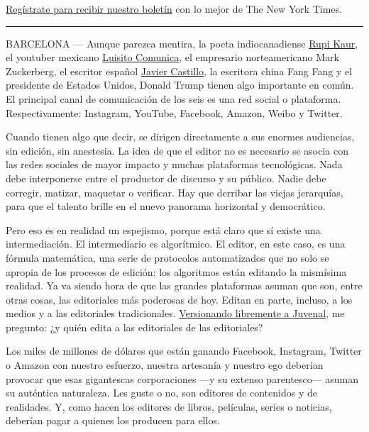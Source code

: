 \href{https://www.nytimes.com/newsletters/el-times}{Regístrate para
recibir nuestro boletín} con lo mejor de The New York Times.

\begin{center}\rule{0.5\linewidth}{\linethickness}\end{center}

BARCELONA --- Aunque parezca mentira, la poeta indiocanadiense
\href{https://www.instagram.com/rupikaur_/?hl=es}{Rupi Kaur}, el
youtuber mexicano
\href{https://www.youtube.com/user/LuisitoComunicaa}{Luisito Comunica},
el empresario norteamericano Mark Zuckerberg, el escritor español
\href{https://elpais.com/elpais/2020/03/04/icon/1583314253_152494.html}{Javier
Castillo}, la escritora china Fang Fang y el presidente de Estados
Unidos, Donald Trump tienen algo importante en común. El principal canal
de comunicación de los seis es una red social o plataforma.
Respectivamente: Instagram, YouTube, Facebook, Amazon, Weibo y Twitter.

Cuando tienen algo que decir, se dirigen directamente a sus enormes
audiencias, sin edición, sin anestesia. La idea de que el editor no es
necesario se asocia con las redes sociales de mayor impacto y muchas
plataformas tecnológicas. Nada debe interponerse entre el productor de
discurso y su público. Nadie debe corregir, matizar, maquetar o
verificar. Hay que derribar las viejas jerarquías, para que el talento
brille en el nuevo panorama horizontal y democrático.

Pero eso es en realidad un espejismo, porque está claro que sí existe
una intermediación. El intermediario es algorítmico. El editor, en este
caso, es una fórmula matemática, una serie de protocolos automatizados
que no solo se apropia de los procesos de edición: los algoritmos están
editando la mismísima realidad. Ya va siendo hora de que las grandes
plataformas asuman que son, entre otras cosas, las editoriales más
poderosas de hoy. Editan en parte, incluso, a los medios y a las
editoriales tradicionales.
\href{https://www.merriam-webster.com/dictionary/quis\%20custodiet\%20ipsos\%20custodes\%3F}{Versionando
libremente a Juvenal}, me pregunto: ¿y quién edita a las editoriales de
las editoriales?

Los miles de millones de dólares que están ganando Facebook, Instagram,
Twitter o Amazon con nuestro esfuerzo, nuestra artesanía y nuestro ego
deberían provocar que esas gigantescas corporaciones ---y su extenso
parentesco--- asuman su auténtica naturaleza. Les guste o no, son
editores de contenidos y de realidades. Y, como hacen los editores de
libros, películas, series o noticias, deberían pagar a quienes los
producen para ellos.

